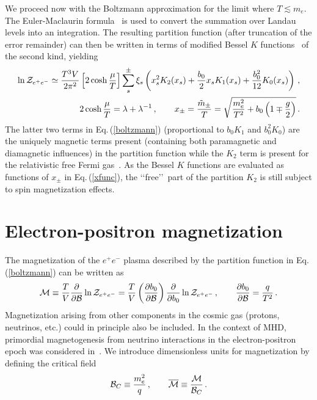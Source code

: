 \documentclass[a4paper]{article}
\newcommand{\req}[1]{Eq.\,(\ref{#1})}
\begin{document}
We proceed now with the Boltzmann approximation for the limit where $T\lesssim m_e$. The Euler-Maclaurin formula~\cite{abramowitz1988handbook} is used to convert the summation over Landau levels into an integration. The resulting partition function (after truncation of the error remainder) can then be written in terms of modified Bessel $K$ functions~\cite{abramowitz1988handbook,letessier2002hadrons} of the second kind, yielding
\begin{align}
    \label{boltzmann}
    \ln{\cal Z}_{e^{+}e^{-}}\simeq\frac{T^{3}V}{2\pi^{2}}\left[2\cosh{\frac{\mu}{T}}\right]\sum_{s}^{\pm}\xi_{s}\left(x_{s}^{2}K_{2}(x_{s})+\frac{b_{0}}{2}x_{s}K_{1}(x_{s})+\frac{b_{0}^{2}}{12}K_{0}(x_{s})\right)\,,\\
    \label{xfunc}
    2\cosh{\frac{\mu}{T}}=\lambda+\lambda^{-1}\,,\qquad
    x_{\pm}=\frac{{\tilde m}_{\pm}}{T}=\sqrt{\frac{m_{e}^{2}}{T^{2}}+b_{0}\left(1\mp\frac{g}{2}\right)}\,.
\end{align}
The latter two terms in \req{boltzmann} (proportional to $b_{0}K_{1}$ and $b_{0}^{2}K_{0}$) are the uniquely magnetic terms present (containing both paramagnetic and diamagnetic influences) in the partition function while the $K_{2}$ term is present for the relativistic free Fermi gas~\cite{greiner2012thermodynamics}. As the Bessel $K$ functions are evaluated as functions of $x_{\pm}$ in \req{xfunc}, the \lq\lq free\rq\rq\ part of the partition $K_{2}$ is still subject to spin magnetization effects.
\section{Electron-positron magnetization}
\label{sec:magnetization}
\noindent The magnetization of the $e^{+}e^{-}$ plasma described by the partition function in \req{boltzmann} can be written as
\begin{align}
    \label{defmagetization}
    {\cal M}\equiv\frac{T}{V}\frac{\partial}{\partial{\cal B}}\ln{{\cal Z}_{e^{+}e^{-}}} = \frac{T}{V}\left(\frac{\partial b_{0}}{\partial{\cal B}}\right)\frac{\partial}{\partial b_{0}}\ln{{\cal Z}_{e^{+}e^{-}}}\,,\qquad\frac{\partial b_{0}}{\partial{\cal B}}=\frac{q}{T^{2}}\,.
\end{align}
Magnetization arising from other components in the cosmic gas (protons, neutrinos, etc.) could in principle also be included. In the context of MHD, primordial magnetogenesis from neutrino interactions in the electron-positron epoch was considered in~\cite{perrone2021neutrinoelectron}. We introduce dimensionless units for magnetization by defining the critical field
\begin{align}
    {\cal B}_{C}\equiv\frac{m_{e}^{2}}{q}\,,\qquad{\overline{\cal M}}\equiv\frac{\cal M}{{\cal B}_{C}}\,.
\end{align}
\end{document}

